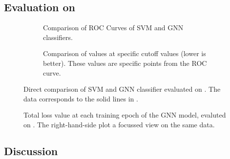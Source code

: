 \documentclass[
	fontsize=10pt, %
	twoside=false, %
	secnumdepth=1, %
]{kaobook}
\begin{document}



\subsection{Evaluation on \ReconMap}


\begin{figure}[h]
  \centering
  \begin{subfigure}[h]{0.49\linewidth}
    \caption{Comparison of ROC Curves of SVM and GNN classifiers.}
  \end{subfigure}
  \begin{subfigure}[h]{0.49\linewidth}
    \caption{Comparison of \FPR values at specific \TPR cutoff values (lower is better). These
      values are specific points from the ROC curve.}
  \end{subfigure}
  \caption{Direct comparison of SVM and GNN classifier evaluated on \ReconMap. The data
    corresponds to the solid lines in .}
  \label{fig:svm-repro-reconmapolder-roc-train-test}
\end{figure}

\begin{figure}[h]
  \centering
  \begin{subfigure}[h]{0.49\linewidth}
  \end{subfigure}
  \begin{subfigure}[h]{0.49\linewidth}
  \end{subfigure}
  \caption{Total loss value at each training epoch of the GNN model, evaluted on
    \ReconMap. The right-hand-side plot a focussed view on the same data.}
  \label{fig:svm-repro-reconmapolder-loss}
\end{figure}

\subsection{Discussion}
\end{document}

